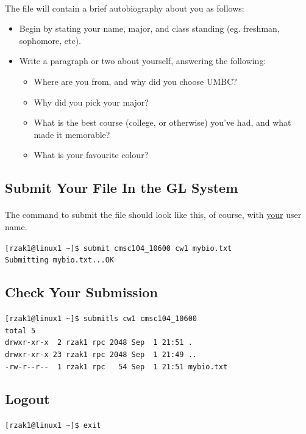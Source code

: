 \documentclass[letter,11pt]{article}
\begin{document}
\paragraph{}The file will contain a brief autobiography about you as follows:
\begin{itemize}
    \item Begin by stating your name, major, and class standing (eg. freshman, sophomore, etc).
    \item Write a paragraph or two about yourself, answering the following:
    \begin{itemize}
        \item Where are you from, and why did you choose UMBC?
        \item Why did you pick your major?
        \item What is the best course (college, or otherwise) you've had, and what made it memorable?
        \item What is your favourite colour?
    \end{itemize}
\end{itemize}

\subsection{Submit Your File In the GL System}
\paragraph{}The command to submit the file should look like this, of course, with \underline{your} user name.

\verb|[rzak1@linux1 ~]$ submit cmsc104_10600 cw1 mybio.txt| \\
\verb|Submitting mybio.txt...OK|

\subsection{Check Your Submission}
\verb|[rzak1@linux1 ~]$ submitls cw1 cmsc104_10600| \\
\verb|total 5| \\
\verb|drwxr-xr-x  2 rzak1 rpc 2048 Sep  1 21:51 .| \\
\verb|drwxr-xr-x 23 rzak1 rpc 2048 Sep  1 21:49 ..| \\
\verb|-rw-r--r--  1 rzak1 rpc   54 Sep  1 21:51 mybio.txt|

\subsection{Logout}
\verb|[rzak1@linux1 ~]$ exit| 
\end{document}
